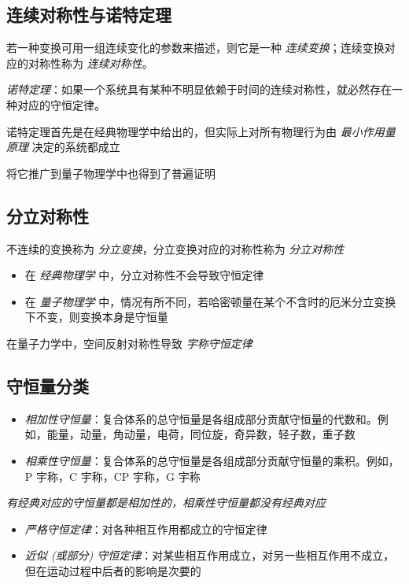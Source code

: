 \subsection{连续对称性与诺特定理}

若一种变换可用一组连续变化的参数来描述，则它是一种 \emph{连续变换}；连续变换对应的对称性称为 \emph{连续对称性}。

\emph{诺特定理}：如果一个系统具有某种不明显依赖于时间的连续对称性，就必然存在一种对应的守恒定律。

诺特定理首先是在经典物理学中给出的，但实际上对所有物理行为由 \emph{最小作用量原理} 决定的系统都成立

将它推广到量子物理学中也得到了普遍证明

\subsection{分立对称性}

不连续的变换称为 \emph{分立变换}，分立变换对应的对称性称为 \emph{分立对称性}

\begin{itemize}
    \item 在 \emph{经典物理学} 中，分立对称性不会导致守恒定律
    \item 在 \emph{量子物理学} 中，情况有所不同，若哈密顿量在某个不含时的厄米分立变换下不变，则变换本身是守恒量
\end{itemize}

在量子力学中，空间反射对称性导致 \emph{宇称守恒定律}

\subsection{守恒量分类}

\begin{itemize}
    \item \emph{相加性守恒量}：复合体系的总守恒量是各组成部分贡献守恒量的代数和。例如，能量，动量，角动量，电荷，同位旋，奇异数，轻子数，重子数
    \item \emph{相乘性守恒量}：复合体系的总守恒量是各组成部分贡献守恒量的乘积。例如，P 宇称，C 宇称，CP 宇称，G 宇称
\end{itemize}

\emph{有经典对应的守恒量都是相加性的，相乘性守恒量都没有经典对应}

\begin{itemize}
    \item \emph{严格守恒定律}：对各种相互作用都成立的守恒定律
    \item \emph{近似 (或部分) 守恒定律}：对某些相互作用成立，对另一些相互作用不成立，但在运动过程中后者的影响是次要的
\end{itemize}

